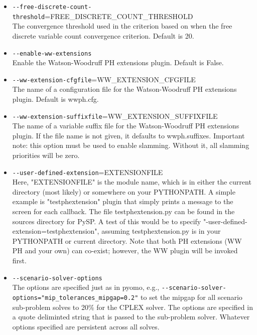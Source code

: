 \begin{itemize}
  \item \verb|--free-discrete-count-threshold|=FREE\_DISCRETE\_COUNT\_THRESHOLD \\
  The convergence threshold used in the criterion based on when the free
  discrete variable count convergence criterion. Default is 20.

  \item \verb|--enable-ww-extensions|                                                                                                                                          \\
  Enable the Watson-Woodruff PH extensions plugin. Default is False.

  \item \verb|--ww-extension-cfgfile|=WW\_EXTENSION\_CFGFILE                 \\
  The name of a configuration file for the Watson-Woodruff PH extensions plugin.
  Default is wwph.cfg.

  \item \verb|--ww-extension-suffixfile|=WW\_EXTENSION\_SUFFIXFILE           \\
  The name of a variable suffix file for the Watson-Woodruff PH extensions
  plugin. If the file name is not given, it defaults to wwph.suffixes. 
Important note: this option must
be used to enable slamming. Without it, all slamming priorities will
be zero.

  \item \verb|--user-defined-extension|=EXTENSIONFILE                        \\
  Here, "EXTENSIONFILE" is the module name, which is in either the current
  directory (most likely) or somewhere on your PYTHONPATH. A simple example is
  "testphextension" plugin that simply prints a message to the screen for each
  callback. The file testphextension.py can be found in the sources directory
  for PySP. A test of this would be to
  specify "-user-defined-extension=testphextension", assuming testphextension.py
  is in your PYTHONPATH or current directory. Note that both PH extensions (WW
  PH and your own) can co-exist; however, the WW plugin will be invoked first.

  \item \verb|--scenario-solver-options|                                     \\
  The options are specified just as in pyomo, e.g.,
  \verb|--scenario-solver-options="mip_tolerances_mipgap=0.2"| to set the mipgap
  for all scenario sub-problem solves to 20\% for the CPLEX solver. The options
  are specified in a quote deliminted string that is passed to the sub-problem
  solver. Whatever options specified are persistent across all solves.


\end{itemize}
